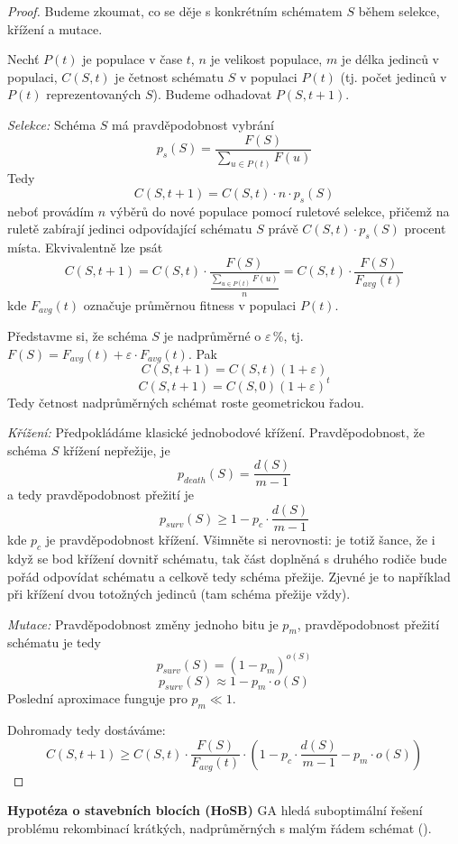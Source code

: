 \begin{proof} Budeme zkoumat, co se děje s konkrétním schématem $S$ během selekce, křížení a mutace.

Nechť $P(t)$ je populace v čase $t$, $n$ je velikost populace, $m$ je délka jedinců v populaci, $C(S,t)$ je četnost schématu $S$ v populaci $P(t)$ (tj. počet jedinců v $P(t)$ reprezentovaných $S$). Budeme odhadovat $P(S, t+1)$.

\textit{Selekce:} Schéma $S$ má pravděpodobnost vybrání
$$p_s(S) = \frac{F(S)}{\sum\limits_{u \in P(t)}F(u)}$$
Tedy 
$$C(S,t+1) = C(S,t) \cdot n \cdot p_s(S)$$
neboť provádím $n$ výběrů do nové populace pomocí ruletové selekce, přičemž na ruletě zabírají jedinci odpovídající schématu $S$ právě $C(S,t) \cdot p_s(S)$ procent místa. Ekvivalentně lze psát
$$C(S,t+1) = C(S,t) \cdot \frac{F(S)}{\frac{\sum_{u \in P(t)}F(u)}{n}} = C(S,t) \cdot \frac{F(S)}{F_{avg}(t)}$$
kde $F_{avg}(t)$ označuje průměrnou fitness v populaci $P(t)$. 

Představme si, že schéma $S$ je nadprůměrné o $\varepsilon$\,\%, tj. $F(S) = F_{avg}(t) + \varepsilon\cdot F_{avg}(t)$. Pak 
$$C(S,t+1) = C(S,t)(1+\varepsilon)$$
$$C(S,t+1) = C(S,0)(1+\varepsilon)^t$$
Tedy četnost nadprůměrných schémat roste geometrickou řadou.

\textit{Křížení:} Předpokládáme klasické jednobodové křížení. Pravděpodobnost, že schéma $S$ křížení nepřežije, je 
$$p_{death}(S) = \frac{d(S)}{m-1}$$
a tedy pravděpodobnost přežití je 
$$p_{surv}(S) \geq 1 - p_c \cdot \frac{d(S)}{m-1}$$
kde $p_c$ je pravděpodobnost křížení. Všimněte si nerovnosti: je totiž šance, že i když se bod křížení  dovnitř schématu, tak část doplněná s druhého rodiče bude pořád odpovídat schématu a celkově tedy schéma přežije. Zjevné je to například při křížení dvou totožných jedinců (tam schéma přežije vždy).

\textit{Mutace:} Pravděpodobnost změny jednoho bitu je $p_m$, pravděpodobnost přežití schématu je tedy 
$$p_{surv}(S) = (1-p_m)^{o(S)}$$
$$p_{surv}(S) \approx 1 - p_m \cdot o(S)$$
Poslední aproximace funguje pro $p_m \ll 1$.

Dohromady tedy dostáváme:
$$C(S,t+1) \geq C(S,t) \cdot \frac{F(S)}{F_{avg}(t)} \cdot \left(1 - p_c \cdot \frac{d(S)}{m-1} - p_m \cdot o(S)\right)$$
\end{proof}

\textbf{Hypotéza o stavebních blocích (HoSB)} GA hledá suboptimální řešení problému rekombinací krátkých, nadprůměrných s malým řádem schémat ().

